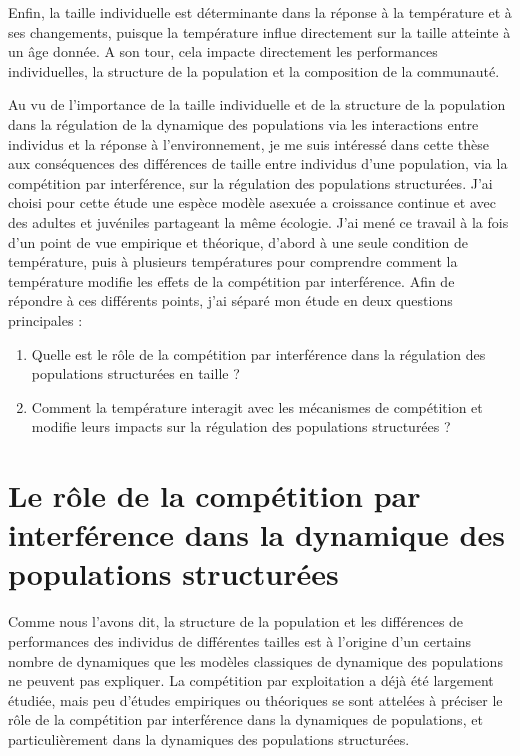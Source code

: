 Enfin, la taille individuelle est déterminante dans la réponse à la température
et à ses changements, puisque la température influe directement sur la taille
atteinte à un âge donnée. A son tour, cela impacte directement les performances
individuelles, la structure de la population et la composition de la communauté. 

Au vu de l'importance de la taille individuelle et de la structure de la
population dans la régulation de la dynamique des populations via les
interactions entre individus et la réponse à l'environnement, je me suis
intéressé dans cette thèse aux conséquences des différences de taille entre
individus d'une population, via la compétition par interférence, sur la
régulation des populations structurées.  J'ai choisi pour cette étude une espèce
modèle asexuée a croissance continue et avec des adultes et juvéniles partageant
la même écologie. J'ai mené ce travail à la fois d'un point de vue empirique et
théorique, d'abord à une seule condition de température, puis à plusieurs
températures pour comprendre comment la température modifie les effets de la
compétition par interférence. Afin de répondre à ces différents points, j'ai
séparé mon étude en deux questions principales :
\begin{enumerate}
  \item Quelle est le rôle de la compétition par interférence dans la régulation
  des populations structurées en taille ?
  \item Comment la température interagit avec les mécanismes de compétition et
  modifie leurs impacts sur la régulation des populations structurées ?
\end{enumerate}

\section{Le rôle de la compétition par interférence dans la dynamique des
populations structurées}

Comme nous l'avons dit, la structure de la population et les différences de
performances des individus de différentes tailles est à l'origine d'un certains
nombre de dynamiques que les modèles classiques de dynamique des populations ne
peuvent pas expliquer. La compétition par exploitation a déjà été largement
étudiée, mais peu d'études empiriques ou théoriques se sont attelées à préciser
le rôle de la compétition par interférence dans la dynamiques de populations, et
particulièrement dans la dynamiques des populations structurées.

